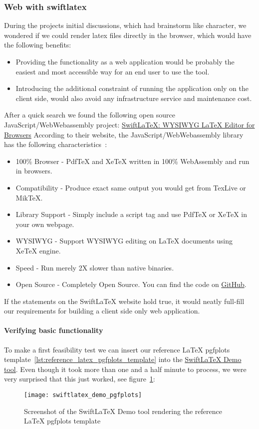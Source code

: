 \subsubsection{Web with swiftlatex}
During the projects initial discussions, which had brainstorm like character, we wondered if we could render latex files directly in the browser, which would have the following benefits:
\begin{itemize}
    \item Providing the functionality as a web application would be probably the easiest and most accessible way for an end user to use the tool.
    \item Introducing the additional constraint of running the application only on the client side, would also avoid any infrastructure service and maintenance cost.
\end{itemize}
After a quick search we found the following open source JavaScript/WebWebassembly project: \href{https://www.swiftlatex.com/}{SwiftLaTeX: WYSIWYG LaTeX Editor for Browsers}
According to their website, the JavaScript/WebWebassembly library has the following characteristics~\cite{swiftlatex_website}:
\begin{itemize}
    \item 100\% Browser - PdfTeX and XeTeX written in 100\% WebAssembly and run in browsers.
    \item Compatibility - Produce exact same output you would get from TexLive or MikTeX\@.
    \item Library Support - Simply include a script tag and use PdfTeX or XeTeX in your own webpage.
    \item WYSIWYG - Support WYSIWYG editing on LaTeX documents using XeTeX engine.
    \item Speed - Run merely 2X slower than native binaries.
    \item Open Source - Completely Open Source. You can find the code on \href{https://github.com/SwiftLaTeX/SwiftLaTeX/}{GitHub}.
\end{itemize}
If the statements on the SwiftLaTeX website hold true, it would neatly full-fill our requirements for building a client side only web application.

\paragraph{Verifying basic functionality}\mbox{}\newline
To make a first feasibility test we can insert our reference LaTeX pgfplots template~\ref{lst:reference_latex_pgfplots_template} into the \href{https://www.swiftlatex.com/\#demo}{SwiftLaTeX Demo tool}.
Even though it took more than one and a half minute to process, we were very surprised that this just worked, see figure~\ref{fig:swiftlatex_demo_rendering_latex_pgfplots_template}:
\begin{figure}[H]
    \centering
    \texttt{[image: swiftlatex\_demo\_pgfplots]}
    \caption{Screenshot of the SwiftLaTeX Demo tool rendering the reference LaTeX pgfplots template}
    \label{fig:swiftlatex_demo_rendering_latex_pgfplots_template}
\end{figure}

